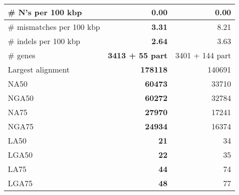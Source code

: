 \documentclass[12pt,a4paper]{article}
\begin{document}
\begin{table}[ht]
\begin{center}
\begin{tabular}{|l*{2}{|r}|}
\# N's per 100 kbp & 0.00 & 0.00 \\ \hline
\# mismatches per 100 kbp & {\bf 3.31} & 8.21 \\ \hline
\# indels per 100 kbp & {\bf 2.64} & 3.63 \\ \hline
\# genes & {\bf 3413 + 55 part} & 3401 + 144 part \\ \hline
Largest alignment & {\bf 178118} & 140691 \\ \hline
NA50 & {\bf 60473} & 33710 \\ \hline
NGA50 & {\bf 60272} & 32784 \\ \hline
NA75 & {\bf 27970} & 17241 \\ \hline
NGA75 & {\bf 24934} & 16374 \\ \hline
LA50 & {\bf 21} & 34 \\ \hline
LGA50 & {\bf 22} & 35 \\ \hline
LA75 & {\bf 44} & 74 \\ \hline
LGA75 & {\bf 48} & 77 \\ \hline
\end{tabular}
\end{center}
\end{table}
\end{document}
